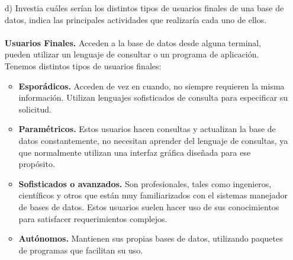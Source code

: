 \documentclass[a4paper, 12pt]{report}
\begin{document}
\begin{enumerate}
{\begin{enumerate}
\begin{itemize}
    	El diseñador debe indentificar las ideas de prueba que se deben explorar para valorar la calidad aceptable de los elementos de prueba de destino como tambien identificar un número suficiente de ideas para validar de forma adecuada elementos de prueba de destino con motivadores de prueba.
    	\item Implementar elementos de diseño:\\
    	El diseñador debe producir una implementación para una parte del diseño (por ejemplo, una clase, una realización de guión de uso o una entidad de base de datos), o para solucionar uno o varios defectos. 
    	\item  Revisar el diseño:\\
    	El diseñador debe verificar que el modelo de diseño cumple los requisitos del sistema y que es una buena base para su implementación, garantizar que el modelo de diseño es coherente con las directrices de diseño generales y que las directrices de diseño cumplen sus objetivos. 


    \end{itemize}
    
    \item[d)] Investia  cuáles  serían  los distintos tipos de 
     usuarios finales de una base de datos, indica las principales
     actividades que realizaría cada uno de ellos. \\\\
     \textbf{Usuarios Finales.} Acceden a la base de datos desde
     alguna terminal, pueden utilizar un lenguaje de consultar o un
     programa de aplicación. Tenemos distintos tipos de usuarios
     finales:
     \begin{itemize}
       \item \textbf{Esporádicos.} Acceden de vez en cuando, no
       siempre requieren la misma información. Utilizan lenguajes
       sofisticados de consulta para especificar su solicitud.\\
       \item \textbf{Paramétricos.} Estos usuarios hacen consultas
       y actualizan la base de datos constantemente, no necesitan
       aprender del lenguaje de consultas, ya que normalmente
       utilizan una interfaz gráfica diseñada para ese propósito.
       \item \textbf{Sofisticados o avanzados.} Son profesionales,
       tales como ingenieros, científicos y otros que están muy
       familiarizados con el sistemas manejador de bases de datos.
       Estos usuarios suelen hacer uso de sus conocimientos para
       satisfacer requerimientos complejos.
       \item \textbf{Autónomos.} Mantienen sus propias bases de datos, utilizando paquetes de programas que facilitan su uso.


\end{itemize}
\end{enumerate}}
\end{enumerate}
\end{document}
